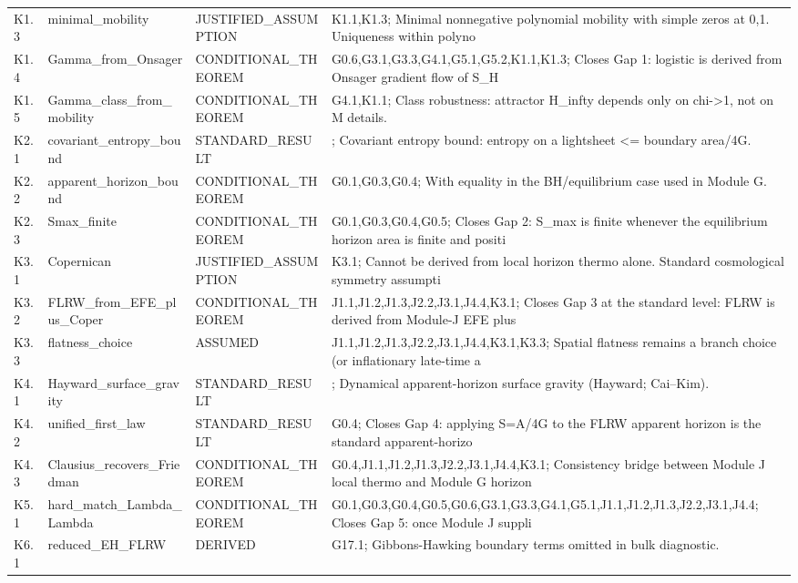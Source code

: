 \documentclass[11pt,a4paper]{article}
\theoremstyle{remark}\newtheorem*{caution}{Caution}
\begin{document}
{\begin{longtable}{@{}p{2.1cm}p{3.1cm}p{2.6cm}p{6cm}@{}}
K1.3 & minimal\_mobility & JUSTIFIED\_ASSUMPTION & K1.1,K1.3; Minimal nonnegative polynomial mobility with simple zeros at 0,1. Uniqueness within polyno \\
K1.4 & Gamma\_from\_Onsager & CONDITIONAL\_THEOREM & G0.6,G3.1,G3.3,G4.1,G5.1,G5.2,K1.1,K1.3; Closes Gap 1: logistic is derived from Onsager gradient flow of S\_H  \\
K1.5 & Gamma\_class\_from\_mobility & CONDITIONAL\_THEOREM & G4.1,K1.1; Class robustness: attractor H\_infty depends only on chi->1, not on M details. \\
K2.1 & covariant\_entropy\_bound & STANDARD\_RESULT & ; Covariant entropy bound: entropy on a lightsheet <= boundary area/4G. \\
K2.2 & apparent\_horizon\_bound & CONDITIONAL\_THEOREM & G0.1,G0.3,G0.4; With equality in the BH/equilibrium case used in Module G. \\
K2.3 & Smax\_finite & CONDITIONAL\_THEOREM & G0.1,G0.3,G0.4,G0.5; Closes Gap 2: S\_max is finite whenever the equilibrium horizon area is finite and positi \\
K3.1 & Copernican & JUSTIFIED\_ASSUMPTION & K3.1; Cannot be derived from local horizon thermo alone. Standard cosmological symmetry assumpti \\
K3.2 & FLRW\_from\_EFE\_plus\_Coper & CONDITIONAL\_THEOREM & J1.1,J1.2,J1.3,J2.2,J3.1,J4.4,K3.1; Closes Gap 3 at the standard level: FLRW is derived from Module-J EFE plus \\
K3.3 & flatness\_choice & ASSUMED & J1.1,J1.2,J1.3,J2.2,J3.1,J4.4,K3.1,K3.3; Spatial flatness remains a branch choice (or inflationary late-time a \\
K4.1 & Hayward\_surface\_gravity & STANDARD\_RESULT & ; Dynamical apparent-horizon surface gravity (Hayward; Cai–Kim). \\
K4.2 & unified\_first\_law & STANDARD\_RESULT & G0.4; Closes Gap 4: applying S=A/4G to the FLRW apparent horizon is the standard apparent-horizo \\
K4.3 & Clausius\_recovers\_Friedman & CONDITIONAL\_THEOREM & G0.4,J1.1,J1.2,J1.3,J2.2,J3.1,J4.4,K3.1; Consistency bridge between Module J local thermo and Module G horizon \\
K5.1 & hard\_match\_Lambda\_Lambda\ & CONDITIONAL\_THEOREM & G0.1,G0.3,G0.4,G0.5,G0.6,G3.1,G3.3,G4.1,G5.1,J1.1,J1.2,J1.3,J2.2,J3.1,J4.4; Closes Gap 5: once Module J suppli \\
K6.1 & reduced\_EH\_FLRW & DERIVED & G17.1; Gibbons-Hawking boundary terms omitted in bulk diagnostic. \\

\end{longtable}}
\end{document}
